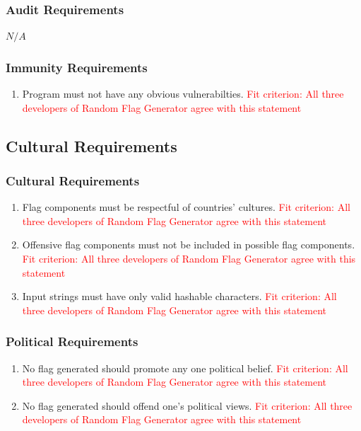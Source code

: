 \documentclass[12pt, titlepage]{article}
\begin{document}
\subsubsection{Audit Requirements}
$N/A$
\subsubsection{Immunity Requirements}
\begin{enumerate}[label=SR\arabic*., resume=srs]
    \item Program must not have any obvious vulnerabilties. \textcolor{red}{Fit criterion: All three developers of Random Flag Generator agree with this statement}
\end{enumerate}

\subsection{Cultural Requirements}
\subsubsection{Cultural Requirements}
\begin{enumerate}[label=CP\arabic*., series=cps]
    \item Flag components must be respectful of countries' cultures. \textcolor{red}{Fit criterion: All three developers of Random Flag Generator agree with this statement}
    \item Offensive flag components must not be included in possible flag components. \textcolor{red}{Fit criterion: All three developers of Random Flag Generator agree with this statement}
    \item Input strings must have only valid hashable characters. \textcolor{red}{Fit criterion: All three developers of Random Flag Generator agree with this statement}
\end{enumerate}
\subsubsection{Political Requirements}
\begin{enumerate}[label=CP\arabic*., resume=cps]
    \item No flag generated should promote any one political belief. \textcolor{red}{Fit criterion: All three developers of Random Flag Generator agree with this statement}
    \item No flag generated should offend one's political views. \textcolor{red}{Fit criterion: All three developers of Random Flag Generator agree with this statement}
\end{enumerate}
\end{document}
